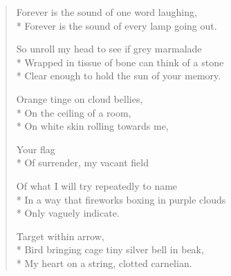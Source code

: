 \documentclass[english,11pt,letterpaper,onecolumn]{scrbook}
\begin{document}
\begin{verse}
Forever is the sound of one word laughing, \\*
Forever is the sound of every lamp going out.



So unroll my head to see if grey marmalade \\*
Wrapped in tissue of bone can think of a stone \\*
Clear enough to hold the sun of your memory.



Orange tinge on cloud bellies, \\*
On the ceiling of a room, \\*
On white skin rolling towards me,



Your flag  \\*
Of surrender, my vacant field



Of what I will try repeatedly to name \\*
In a way that fireworks boxing in purple clouds \\*
Only vaguely indicate.



Target within arrow, \\*
Bird bringing cage tiny silver bell in beak, \\*
My heart on a string, clotted carnelian.

\end{verse}

\newpage
{}
\end{document}
